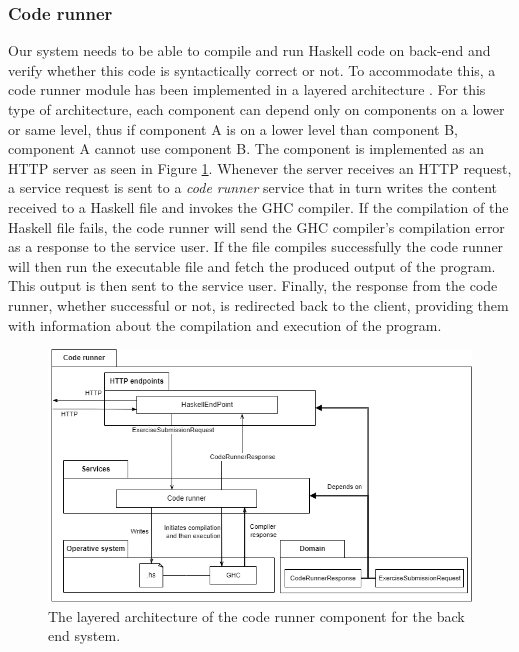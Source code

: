 \subsubsection{Code runner}
Our system needs to be able to compile and run Haskell code on back-end and verify whether this code is syntactically correct or not.
To accommodate this, a code runner module has been implemented in a layered architecture \cite{roede_aalborg}.
For this type of architecture, each component can depend only on components on a lower or same level, thus if component A is on a lower level than component B, component A cannot use component B.
The component is implemented as an HTTP server as seen in Figure \ref{fig:code_runner}.
Whenever the server receives an HTTP request, a service request is sent to a \textit{code runner} service that in turn writes the content received to a Haskell file and invokes the GHC compiler.
If the compilation of the Haskell file fails, the code runner will send the GHC compiler's compilation error as a response to the service user.
If the file compiles successfully the code runner will then run the executable file and fetch the produced output of the program.
This output is then sent to the service user.
Finally, the response from the code runner, whether successful or not, is redirected back to the client, providing them with information about the compilation and execution of the program.
\begin{figure}
    \centering
    \includegraphics[width=\textwidth,height=\textheight,keepaspectratio]{sections/Chapter 2/pics/P7 arch-Backend - HS compiler.drawio.png}
    \caption[]{The layered architecture of the code runner component for the back end system.}
    \label{fig:code_runner}
\end{figure}


